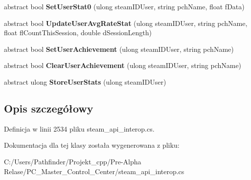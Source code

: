 \begin{DoxyCompactItemize}
abstract bool {\bfseries Set\+User\+Stat0} (ulong steam\+I\+D\+User, string pch\+Name, float f\+Data)
\item 
\mbox{\label{class_valve_1_1_steamworks_1_1_i_steam_game_server_stats_af4f9e4018acfcb5edce7e22a14391904}} 
abstract bool {\bfseries Update\+User\+Avg\+Rate\+Stat} (ulong steam\+I\+D\+User, string pch\+Name, float fl\+Count\+This\+Session, double d\+Session\+Length)
\item 
\mbox{\label{class_valve_1_1_steamworks_1_1_i_steam_game_server_stats_a91cc5fddef5d4ad85ce38e2728b1bc10}} 
abstract bool {\bfseries Set\+User\+Achievement} (ulong steam\+I\+D\+User, string pch\+Name)
\item 
\mbox{\label{class_valve_1_1_steamworks_1_1_i_steam_game_server_stats_a7296600f875e9bac75378e3afeb73441}} 
abstract bool {\bfseries Clear\+User\+Achievement} (ulong steam\+I\+D\+User, string pch\+Name)
\item 
\mbox{\label{class_valve_1_1_steamworks_1_1_i_steam_game_server_stats_a0654f84f3fe0492d3ba5cc1a4b43af22}} 
abstract ulong {\bfseries Store\+User\+Stats} (ulong steam\+I\+D\+User)
\end{DoxyCompactItemize}


\subsection{Opis szczegółowy}


Definicja w linii 2534 pliku steam\+\_\+api\+\_\+interop.\+cs.



Dokumentacja dla tej klasy została wygenerowana z pliku\+:\begin{DoxyCompactItemize}
\item 
C\+:/\+Users/\+Pathfinder/\+Projekt\+\_\+cpp/\+Pre-\/\+Alpha Relase/\+P\+C\+\_\+\+Master\+\_\+\+Control\+\_\+\+Center/steam\+\_\+api\+\_\+interop.\+cs\end{DoxyCompactItemize}
